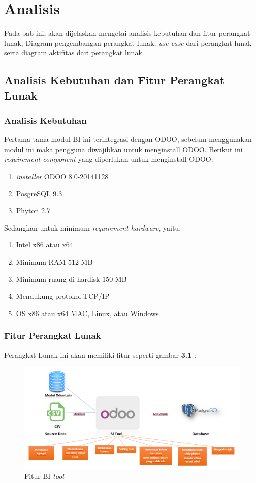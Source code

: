 \chapter{Analisis}
\label{chap:analysis}
Pada bab ini, akan dijelaskan mengetai analisis kebutuhan dan fitur perangkat lunak, Diagram pengembangan perangkat lunak, \textit{use case} dari perangkat lunak serta diagram aktifitas dari perangkat lunak.
\section{Analisis Kebutuhan dan Fitur Perangkat Lunak}
\subsection{Analisis Kebutuhan}
Pertama-tama modul BI ini terintegrasi dengan ODOO, sebelum menggunakan modul ini maka pengguna diwajibkan untuk menginstall ODOO. Berikut ini \textit{requirement component} yang diperlukan untuk menginstall ODOO:
\begin{enumerate}
	\item \textit{installer} ODOO 8.0-20141128
	\item PosgreSQL 9.3
	\item Phyton 2.7
\end{enumerate} 
Sedangkan untuk minimum \textit{requirement hardware}, yaitu: 
\begin{enumerate}
	\item Intel x86 atau x64
	\item Minimum RAM 512 MB
	\item Minimum ruang di hardisk 150 MB
	\item Mendukung protokol TCP/IP
	\item OS x86 atau x64 MAC, Linux, atau Windows
\end{enumerate}
 
\subsection{Fitur Perangkat Lunak}
Perangkat Lunak ini akan memiliki fitur seperti gambar \textbf{3.1} :
\begin{figure}[h]
	\centering
	\includegraphics[scale=0.5]{Gambar/fitur-bi-tool}
	\caption{Fitur BI \textit{tool}}
	\end{figure}
	
